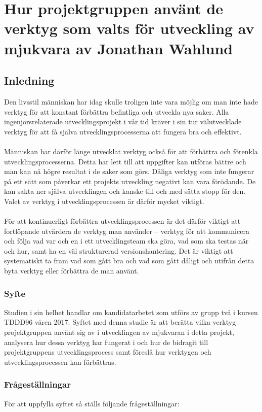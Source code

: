 \chapter{Hur projektgruppen använt de verktyg som valts för utveckling av mjukvara av Jonathan Wahlund}
\section{Inledning}
\label{cha:jonathan-introduction}
Den livsstil människan har idag skulle troligen inte vara möjlig om man inte hade verktyg för att konstant förbättra befintliga och utveckla nya saker. Alla ingenjörsrelaterade utvecklingsprojekt i vår tid kräver i sin tur välutvecklade verktyg för att få själva utvecklingsprocesserna att fungera bra och effektivt.
\\\\
Människan har därför länge utvecklat verktyg också för att förbättra och förenkla utvecklingsprocesserna. Detta har lett till att uppgifter kan utföras bättre och man kan nå högre resultat i de saker som görs. Dåliga verktyg som inte fungerar på ett sätt som påverkar ett projekts utveckling negativt kan vara förödande. De kan sakta ner själva utvecklingen och kanske till och med sätta stopp för den. Valet av verktyg i utvecklingsprocessen är därför mycket viktigt. 
\\\\
För att kontinuerligt förbättra utvecklingsprocessen är det därför viktigt att fortlöpande utvärdera de verktyg man använder – verktyg för att kommunicera och följa vad var och en i ett utvecklingsteam ska göra, vad som ska testas när och hur, samt ha en väl strukturerad versionshantering. Det är viktigt att systematiskt ta fram vad som gått bra och vad som gått dåligt och utifrån detta byta verktyg eller förbättra de man använt.

\subsection{Syfte}
\label{sec:jonathan-aim}
Studien i sin helhet handlar om kandidatarbetet som utförs av grupp två i kursen TDDD96 våren 2017. Syftet med denna studie är att berätta vilka verktyg projektgruppen använt sig av i utvecklingen av mjukvaran i detta projekt, analysera hur dessa verktyg har fungerat i och hur de bidragit till projektgruppens utvecklingsprocess samt föreslå hur verktygen och utvecklingsprocessen kan förbättras. 

\subsection{Frågeställningar}
\label{sec:jonathan-research-questions}
För att uppfylla syftet så ställs följande frågeställningar:

